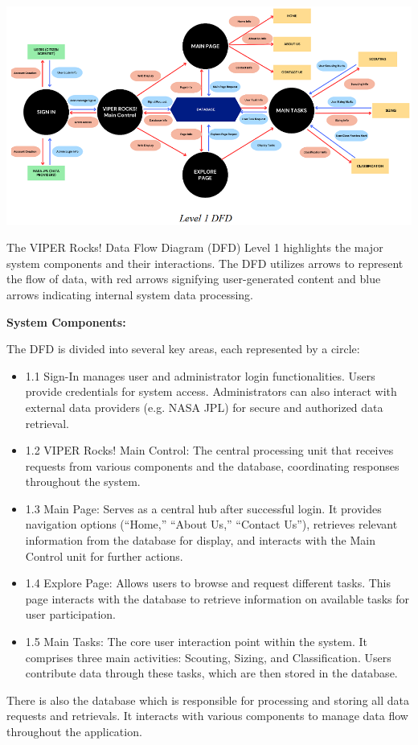 \documentclass{article}
\begin{document}
\includegraphics{DFD_1}

The VIPER Rocks! Data Flow Diagram (DFD) Level 1 highlights the major system components and their interactions. The DFD utilizes arrows to represent the flow of data, with red arrows signifying user-generated content and blue arrows indicating internal system data processing.

\textbf{System Components:}

The DFD is divided into several key areas, each represented by a circle:
\begin{itemize}
	\item 1.1 Sign-In manages user and administrator login functionalities. Users provide credentials for system access. Administrators can also interact with external data providers (e.g. NASA JPL) for secure and authorized data retrieval.
	\item 1.2 VIPER Rocks! Main Control: The central processing unit that receives requests from various components and the database, coordinating responses throughout the system. 
	\item 1.3 Main Page: Serves as a central hub after successful login. It provides navigation options (“Home,” “About Us,” “Contact Us”), retrieves relevant information from the database for display, and interacts with the Main Control unit for further actions.
	\item 1.4 Explore Page: Allows users to browse and request different tasks. This page interacts with the database to retrieve information on available tasks for user participation.
	\item 1.5 Main Tasks: The core user interaction point within the system. It comprises three main activities: Scouting, Sizing, and Classification. Users contribute data through these tasks, which are then stored in the database.
\end{itemize}
There is also the database which is responsible for processing and storing all data requests and retrievals. It interacts with various components to manage data flow throughout the application.
\end{document}
